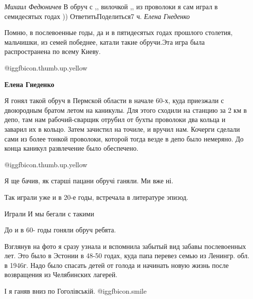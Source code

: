  
 
 
 
 
\zzSecCmt

\begin{itemize} %
\emph{Михаил Федюничев}
В обруч с ,, вилочкой ,, из проволоки я сам играл в семидесятых годах ))
ОтветитьПоделиться7 ч.
\emph{Елена Гнеденко}

Помню, в послевоенные годы, да и в пятидесятых годах прошлого столетия,
мальчишки, из семей победнее, катали такие обручи.Эта игра была распространена
по всему Киеву.

\begin{itemize} %
 @igg{fbicon.thumb.up.yellow} 

\textbf{Елена Гнеденко} 

Я гонял такой обруч в Пермской области в начале 60-х, куда приезжали с
двоюродным братом летом на каникулы. Для этого сходили на станцию за 2 км в
депо, там нам рабочий-сварщик отрубил от бухты проволоки два кольца и заварил
их в кольцо. Затем зачистил на точиле, и вручил нам. Кочерги сделали сами из
более тонкой проволоки, которой тогда везде в депо было немеряно. До конца
каникул развлечение было обеспечено.

 @igg{fbicon.thumb.up.yellow} 
\end{itemize} %

Я ще бачив, як старші пацани обручі ганяли. Ми вже ні.

Так играли уже и в 20-е годы, встречала в литературе эпизод.

Играли
И мы бегали с такими

До и в 60- годы гоняли обруч ребята.


Взглянув на фото я сразу узнала и вспомнила забытый вид забавы послевоенных
лет. Это было в Эстонии в 48-50 годах, куда папа перевез семью из Ленингр. обл. в
1946г. Надо было спасать детей от голода и начинать новую жизнь после
возвращения из Челябинских лагерей.


І я ганяв вниз по Гоголівській.  @igg{fbicon.smile} 


\end{itemize}
